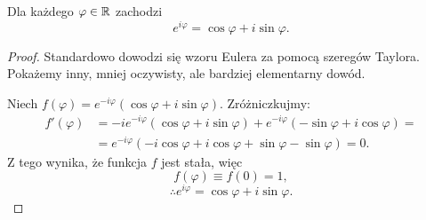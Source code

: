 \begin{theorem}
    Dla każdego $\varphi \in \mathbb R$ zachodzi
    \[ e^{i\varphi} = \cos\varphi + i\sin\varphi. \]
\end{theorem}
\begin{proof}
    Standardowo dowodzi się wzoru Eulera za pomocą szeregów Taylora. Pokażemy inny, mniej oczywisty, ale bardziej elementarny dowód.

    Niech $f(\varphi) = e^{-i\varphi}\left(\cos\varphi + i\sin\varphi\right)$. Zróżniczkujmy:
    \begin{align*}
        f'(\varphi) &= -ie^{-i\varphi}\left(\cos\varphi + i\sin\varphi\right) + e^{-i\varphi}\left(-\sin\varphi + i\cos\varphi\right) = \\
        &= e^{-i\varphi}\left(-i\cos\varphi + i\cos\varphi + \sin\varphi - \sin\varphi\right) = 0.
    \end{align*}
    Z tego wynika, że funkcja $f$ jest stała, więc
    \[ f(\varphi) \equiv f(0) = 1, \]
    \[ \therefore e^{i\varphi} = \cos\varphi + i\sin\varphi. \]
\end{proof}